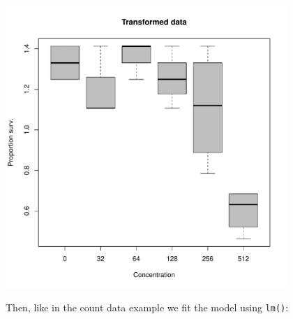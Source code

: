 \begin{knitrout}
\color{fgcolor}\small\begin{kframe}
\begin{alltt}
 \hlopt{~}   
             \hlstd{=} \hlstd{,}  \hlstd{=} \hlstd{,}
             \hlstd{=} \hlstd{,}  \hlstd{=} \hlstd{)}
\end{alltt}
\end{kframe}

{\centering \includegraphics[width=0.8\textwidth]{appendix/usetheglm/two/bin_trans_plot-1} 

}



\end{knitrout}


Then, like in the count data example we fit the model using \texttt{lm()}:
\begin{knitrout}
\color{fgcolor}\small\begin{kframe}
\begin{alltt}
 \hlkwb{<-}  \hlopt{~}   
\end{alltt}
\end{kframe}
\end{knitrout}

